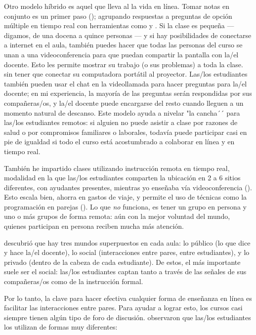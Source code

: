Otro modelo híbrido es aquel que lleva al la vida en línea.
Tomar notas en conjunto es un primer paso ();
agrupando respuestas a preguntas de opción múltiple en tiempo real
con herramientas como 
y .
Si la clase es pequeña --- digamos, de una docena a quince personas ---
y si hay posibilidades de conectarse a internet en el aula,
también puedes
hacer que todas las personas del curso se unan a una videoconferencia
para que puedan compartir la pantalla con la/el docente.
Esto les permite mostrar su trabajo (o sus problemas) a toda la clase.
sin tener que conectar su computadora portátil al proyector.
Las/los estudiantes también pueden usar el chat en la videollamada para hacer preguntas para la/el docente;
en mi experiencia,
la mayoría de las preguntas serán respondidas por sus compañeras/os,
y la/el docente puede encargarse del resto cuando lleguen a un momento natural de descanso.
Este modelo ayuda a nivelar "la cancha´´ para las/los estudiantes remotos:
si alguien no puede asistir a clase por razones de salud
o por compromisos familiares o laborales,
todavía puede participar casi en pie de igualdad
si todo el curso está acostumbrado a colaborar en línea y en tiempo real.

También he impartido clases utilizando instrucción remota en tiempo real,
modalidad en la que las/los estudiantes comparten la ubicación en 2 a 6 sitios diferentes, con ayudantes presentes,
mientras yo enseñaba vía videoconferencia ().
Esto escala bien,
ahorra en gastos de viaje,
y permite el uso de técnicas como la programación en parejas ().
Lo que \emph{no} funciona, es tener un grupo en persona y uno o más grupos de forma remota:
aún con la mejor voluntad del mundo,
quienes participan en persona reciben mucha más atención.


\cite{Nuth2007} descubrió que hay tres mundos superpuestos en cada aula:
lo público (lo que dice y hace la/el docente),
lo social (interacciones entre pares, entre estudiantes),
y lo privado (dentro de la cabeza de cada estudiante).
De estos,
el más importante suele ser el social:
las/los estudiantes captan tanto a través de las señales de sus compañeras/os como de la instrucción formal.

Por lo tanto, la clave para hacer efectiva cualquier forma de enseñanza en línea es
facilitar las interacciones entre pares.
Para ayudar a lograr esto,
los cursos casi siempre tienen algún tipo de foro de discusión.
\cite{Mill2016a} observaron que las/los estudiantes los utilizan de formas muy diferentes:


